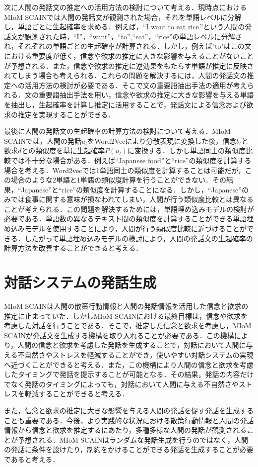 \par
次に人間の発話文の推定への活用方法の検討について考える．現時点におけるMIoM SCAINでは人間の発話文が観測された場合，それを単語レベルに分解し，単語ごとに生起確率を求める．例えば，``I want to eat rice.''という人間の発話文が観測された時，``I''，``want''，``to'',``eat''，``rice''の単語レベルに分解され，それぞれの単語ごとの生起確率が計算される．しかし，例えば"to"はこの文における重要度が低く，信念や欲求の推定に大きな影響を与えることがないことが予想される．また，信念や欲求の推定に逆効果をもたらす単語が推定に反映されてしまう場合も考えられる．これらの問題を解決するには，人間の発話文の推定への活用方法の検討が必要である．そこで文の重要語抽出手法の適用が考えられる．文の重要語抽出手法を用い，信念や欲求の推定に大きな影響を与える単語を抽出し，生起確率を計算し推定に活用することで，発話文による信念および欲求の推定を実現することができる．

\par
最後に人間の発話文の生起確率の計算方法の検討について考える．MIoM SCAINでは，人間の発話$u_t$をWord2Vecにより分散表現に変換した後，信念$b_t$と欲求$d$との類似度を基に生起確率$P(u_t)$に変換する．しかし単語同士の類似度比較では不十分な場合がある．例えば``Japanese food''と``rice''の類似度を計算する場合を考える．Word2vecでは1単語同士の類似度を計算することは可能だが，この場合のような2単語と1単語の類似度計算を行うことができない．その結果，``Japanese''と``rice''の類似度を計算することになる．しかし，``Japanese''のみでは食事に関する意味が損なわれてしまい，人間が行う類似度比較とは異なることが考えられる．この問題を解決するためには，単語埋め込みモデルの検討が必要である．単語数の異なるテキスト間の類似度を計算することができる単語埋め込みモデルを使用することにより，人間が行う類似度比較に近づけることができる．したがって単語埋め込みモデルの検討により，人間の発話文の生起確率の計算方法を改善することができると考える．


\section{対話システムの発話生成}

\par
MIoM SCAINは人間の散策行動情報と人間の発話情報を活用した信念と欲求の推定に止まっていた．しかしMIoM SCAINにおける最終目標は，信念や欲求を考慮した対話を行うことである．そこで，推定した信念と欲求を考慮し，MIoM SCAINが発話文を生成する機構を取り入れることが必要である．この機構により，人間の信念と欲求を考慮した発話を生成することで，対話において人間に与える不自然さやストレスを軽減することができ，使いやすい対話システムの実現へ近づくことができると考える．また，この機構により人間の信念と欲求を考慮したタイミングで発話を提示することが可能となる．その結果，発話の内容だけでなく発話のタイミングによっても，対話において人間に与える不自然さやストレスを軽減することができると考える．

\par
また，信念と欲求の推定に大きな影響を与える人間の発話を促す発話を生成することも重要である．今後，より実践的な状況における散策行動情報と人間の発話情報から信念と欲求を推定するにあたり，多種多様な人間の発話が観測されることが予想される．MIoM SCAINはランダムな発話生成を行うのではなく，人間の発話に条件を設けたり，制約をかけることができる発話を生成することが必要であると考える．
